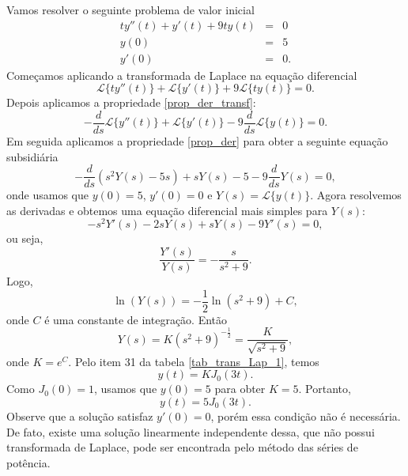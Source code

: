 \begin{ex}Vamos resolver o seguinte problema de valor inicial
\begin{eqnarray*}
ty''(t)+y'(t)+9ty(t)&=&0\\
y(0)&=&5\\
y'(0)&=&0.
\end{eqnarray*}
Começamos aplicando a transformada de Laplace na equação diferencial
$$
\mathcal{L}\{ty''(t)\}+\mathcal{L}\{y'(t)\}+9\mathcal{L}\{ty(t)\}=0.
$$
Depois aplicamos a propriedade \ref{prop_der_transf}:
$$
-\frac{d}{ds}\mathcal{L}\{y''(t)\}+\mathcal{L}\{y'(t)\}-9\frac{d}{ds}\mathcal{L}\{y(t)\}=0.
$$
Em seguida aplicamos a propriedade \ref{prop_der} para obter a seguinte equação subsidiária
$$
-\frac{d}{ds}\left(s^2Y(s)-5s\right)+sY(s)-5-9\frac{d}{ds}Y(s)=0,
$$
onde usamos que $y(0)=5$, $y'(0)=0$ e $Y(s)=\mathcal{L}\{y(t)\}$. Agora resolvemos as derivadas e obtemos uma equação diferencial mais simples para $Y(s)$:
$$
-s^2Y'(s)-2sY(s)+sY(s)-9Y'(s)=0,
$$
ou seja,
$$
\frac{Y'(s)}{Y(s)}=-\frac{s}{s^2+9}.
$$
Logo,
$$
\ln(Y(s))=-\frac{1}{2}\ln(s^2+9)+C,
$$
onde $C$ é uma constante de integração. Então
$$
Y(s)=K(s^2+9)^{-\frac{1}{2}}=\frac{K}{\sqrt{s^2+9}},
$$
onde $K=e^{C}$. Pelo item 31 da tabela \ref{tab_trans_Lap_1}, temos
$$
y(t)=KJ_0(3t).
$$
Como $J_0(0)=1$, usamos que $y(0)=5$ para obter $K=5$. Portanto,
$$
y(t)=5J_0(3t).
$$
Observe que a solução satisfaz $y'(0)=0$, porém essa condição não é necessária. De fato, existe uma solução linearmente independente dessa, que não possui transformada de Laplace, pode ser encontrada pelo método das séries de potência.
\end{ex}

